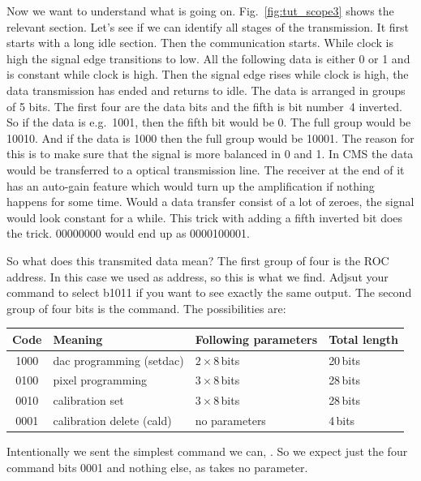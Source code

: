 Now we want to understand what is going on. Fig.~\ref{fig:tut_scope3} shows the relevant section. Let's see if we can identify all stages of the transmission. It first starts with a long idle section. Then the communication starts. While clock is high the signal edge transitions to low. All the following data is either 0 or 1 and is constant while clock is high. Then the signal edge rises while clock is high, the data transmission has ended and returns to idle. The data is arranged in groups of 5 bits. The first four are the data bits and the fifth is bit number~4 inverted. So if the data is e.g.~1001, then the fifth bit would be 0. The full group would be 10010. And if the data is 1000 then the full group would be 10001. The reason for this is to make sure that the signal is more balanced in 0 and 1. In CMS the data would be transferred to a optical transmission line. The receiver at the end of it has an auto-gain feature which would turn up the amplification if nothing happens for some time. Would a data transfer consist of a lot of zeroes, the signal would look constant for a while. This trick with adding a fifth inverted bit does the trick. 00000000 would end up as 0000100001.

So what does this transmited data mean? The first group of four is the ROC address. In this case we used  as address, so this is what we find. Adjsut your  command to select b1011 if you want to see exactly the same output. The second group of four bits is the command. The possibilities are:

\bigskip

\begin{tabular}{clll}
    \toprule
    Code & Meaning & Following parameters & Total length \\
    \midrule
    1000 & dac programming (setdac)    & $2\times8$\,bits & 20\,bits \\
    0100 & pixel programming           & $3\times8$\,bits & 28\,bits \\
    0010 & calibration set             & $3\times8$\,bits & 28\,bits \\
    0001 & calibration delete (cald) & no parameters & 4\,bits \\
    \bottomrule
\end{tabular}

\bigskip

Intentionally we sent the simplest command we can, . So we expect just the four command bits 0001 and nothing else, as  takes no parameter.

